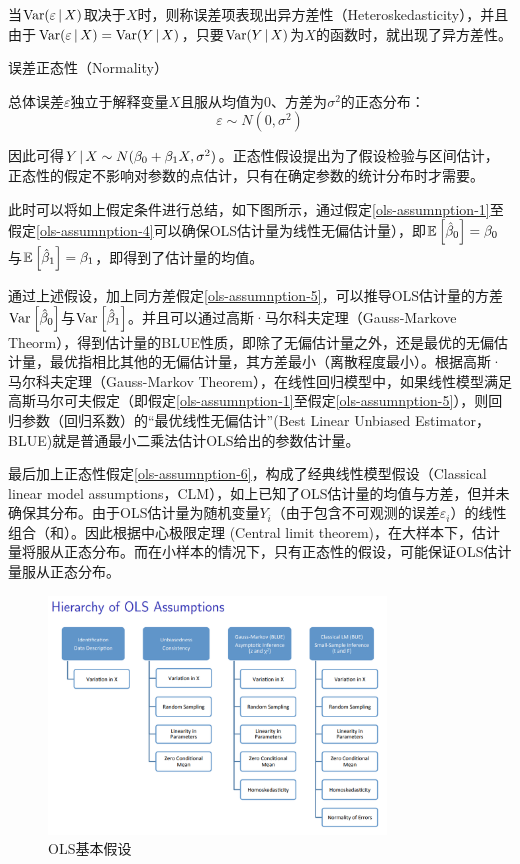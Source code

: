 \documentclass[11pt]{article}
\begin{document}
当$\operatorname{Var}(\varepsilon \,\vert\, X)$取决于$X$时，则称误差项表现出异方差性（Heteroskedasticity），并且由于$\operatorname{Var}(\varepsilon \,\vert\, X) = \operatorname{Var}(Y \,\vert\, X)$，只要$\operatorname{Var}(Y \,\vert\, X)$为$X$的函数时，就出现了异方差性。

\begin{assumption}
    误差正态性（Normality）

    总体误差$\varepsilon$独立于解释变量$X$且服从均值为0、方差为$\sigma^2$的正态分布：
    \begin{equation*}
        \varepsilon \sim N(0,\sigma^2)
    \end{equation*}

    \label{ols-assumnption-6}
\end{assumption}

因此可得$Y \,\vert\, X \sim N(\beta_0+\beta_1 X, \sigma^2)$。正态性假设提出为了假设检验与区间估计，正态性的假定不影响对参数的点估计，只有在确定参数的统计分布时才需要。

此时可以将如上假定条件进行总结，如下图所示，通过假定\ref{ols-assumnption-1}至假定\ref{ols-assumnption-4}可以确保OLS估计量为线性无偏估计量），即$\mathbb{E}\left[\hat{\beta}_0\right]=\beta_0$与$\mathbb{E}\left[\hat{\beta}_1\right]=\beta_1$，即得到了估计量的均值。

通过上述假设，加上同方差假定\ref{ols-assumnption-5}，可以推导OLS估计量的方差$\operatorname{Var}\left[\hat{\beta}_0\right]$与$\operatorname{Var}\left[\hat{\beta}_1\right]$。并且可以通过高斯·马尔科夫定理（Gauss-Markove Theorm），得到估计量的BLUE性质，即除了无偏估计量之外，还是最优的无偏估计量，最优指相比其他的无偏估计量，其方差最小（离散程度最小）。根据高斯·马尔科夫定理（Gauss-Markov Theorem），在线性回归模型中，如果线性模型满足高斯马尔可夫假定（即假定\ref{ols-assumnption-1}至假定\ref{ols-assumnption-5}），则回归参数（回归系数）的“最优线性无偏估计”(Best Linear Unbiased Estimator，BLUE)就是普通最小二乘法估计OLS给出的参数估计量。

最后加上正态性假定\ref{ols-assumnption-6}，构成了经典线性模型假设（Classical linear model assumptions，CLM），如上已知了OLS估计量的均值与方差，但并未确保其分布。由于OLS估计量为随机变量$Y_i$（由于包含不可观测的误差$\varepsilon_i$）的线性组合（和）。因此根据中心极限定理 (Central limit theorem)，在大样本下，估计量将服从正态分布。而在小样本的情况下，只有正态性的假设，可能保证OLS估计量服从正态分布。

\begin{figure}[H]
    \centering
    \includegraphics[width=0.8\textwidth]{fig/ols-assumptions.png}
    \caption{OLS基本假设}
    \label{fig:ols-assumptions}
\end{figure}
\end{document}
